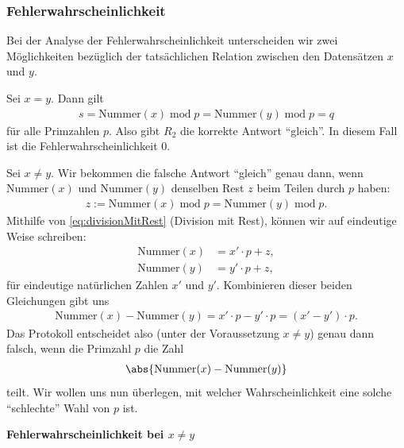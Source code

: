 \subsubsection{Fehlerwahrscheinlichkeit}
Bei der Analyse der Fehlerwahrscheinlichkeit unterscheiden wir zwei Möglichkeiten bezüglich der tatsächlichen Relation zwischen den Datensätzen $x$ und $y$.
\begin{aenum}
	\item Sei $x = y$. Dann gilt
	\begin{align*}
		s = \text{Nummer}(x)\; \text{mod} \; p = \text{Nummer}(y)\; \text{mod} \; p = q
	\end{align*}
	für alle Primzahlen $p$. Also gibt $R_2$ die korrekte Antwort \enquote{gleich}. In diesem Fall ist die Fehlerwahrscheinlichkeit $0$.
	\item Sei $x\neq y$. Wir bekommen die falsche Antwort \enquote{gleich} genau dann, wenn $\text{Nummer}(x)$ und $\text{Nummer}(y)$ denselben Rest $z$ beim Teilen durch $p$ haben:
	\begin{align*}
		z := \text{Nummer}(x)\; \text{mod} \; p = \text{Nummer}(y)\; \text{mod} \; p.
	\end{align*}
	Mithilfe von \cref{eq:divisionMitRest} (Division mit Rest), können wir auf eindeutige Weise schreiben:
	\begin{align*}
		\text{Nummer}(x) & = x'\cdot p + z, \\
		\text{Nummer}(y) & = y'\cdot p + z,
	\end{align*}
	für eindeutige natürlichen Zahlen $x'$ und $y'$. Kombinieren dieser beiden Gleichungen gibt uns
	\begin{align*}
		\text{Nummer}(x)-\text{Nummer}(y) = x'\cdot p -  y'\cdot p = (x'-y')\cdot p.
	\end{align*}
	Das Protokoll entscheidet also (unter der Voraussetzung $x \neq y$) genau dann falsch, wenn die Primzahl $p$ die Zahl
	\begin{align*}
		\abs{\text{Nummer}(x)-\text{Nummer}(y)}
	\end{align*}
	teilt. Wir wollen uns nun überlegen, mit welcher Wahrscheinlichkeit eine solche \enquote{schlechte} Wahl von $p$ ist.

	\bigskip
	\textbf{Fehlerwahrscheinlichkeit bei $x\neq y$}


\end{aenum}
